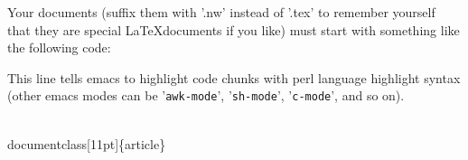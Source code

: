 \documentclass[11pt]{article}
\def\nwendcode{\endtrivlist \endgroup} %
\let\nwdocspar=\par                    %
\begin{document}
Your {\noweb} documents (suffix them with '.nw' instead of '.tex' to remember yourself that they are special \LaTeX documents if you like) must start with something like the following code:

\nwenddocs{}\endmoddef
\nwendcode{}\nwdocspar

This line tells emacs to highlight code chunks with perl language highlight syntax (other emacs modes can be '{\tt{}awk-mode}', '{\tt{}sh-mode}', '{\tt{}c-mode}', and so on).


\nwenddocs{}\endmoddef
\\documentclass[11pt]\{article\}
%
%
%
\nwendcode{}\nwdocspar
\end{document}
